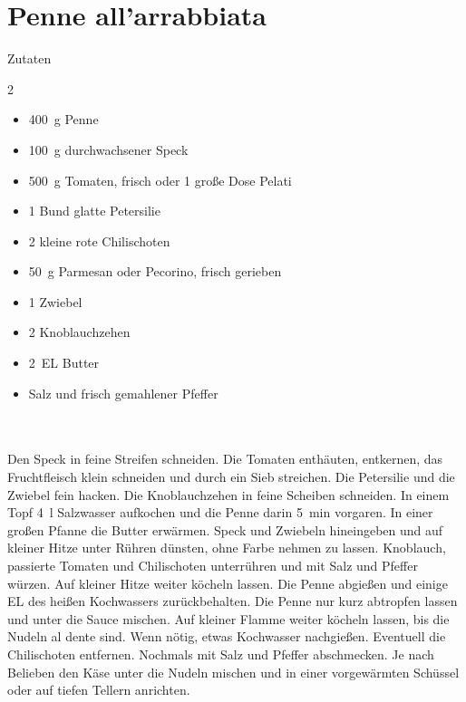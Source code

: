 \section*{Penne all'arrabbiata}
\ihead{}\ohead{}
\cfoot{}
{\Large Zutaten}
\begin{multicols}{2}
\begin{itemize}
\item \SI{400}{g} Penne
\item \SI{100}{g} durchwachsener Speck
\item \SI{500}{g} Tomaten, frisch oder \num{1} große Dose Pelati
\item \num{1} Bund glatte Petersilie
\item \num{2} kleine rote Chilischoten
\item \SI{50}{g} Parmesan oder Pecorino, frisch gerieben
\item \num{1} Zwiebel
\item \num{2} Knoblauchzehen
\item \SI{2}{EL} Butter
\item Salz und frisch gemahlener Pfeffer
\end{itemize}
\end{multicols}
\\
\\
Den Speck in feine Streifen schneiden.
Die Tomaten enthäuten, entkernen, das Fruchtfleisch klein schneiden und durch ein Sieb streichen.
Die Petersilie und die Zwiebel fein hacken.
Die Knoblauchzehen in feine Scheiben schneiden.
In einem Topf \SI{4}{l} Salzwasser aufkochen und die Penne darin \SI{5}{min} vorgaren.
In einer großen Pfanne die Butter erwärmen.
Speck und Zwiebeln hineingeben und auf kleiner Hitze unter Rühren dünsten, ohne Farbe nehmen zu lassen.
Knoblauch, passierte Tomaten und Chilischoten unterrühren und mit Salz und Pfeffer würzen.
Auf kleiner Hitze weiter köcheln lassen.
Die Penne abgießen und einige EL des heißen Kochwassers zurückbehalten.
Die Penne nur kurz abtropfen lassen und unter die Sauce mischen.
Auf kleiner Flamme weiter köcheln lassen, bis die Nudeln al dente sind.
Wenn nötig, etwas Kochwasser nachgießen.
Eventuell die Chilischoten entfernen.
Nochmals mit Salz und Pfeffer abschmecken.
Je nach Belieben den Käse unter die Nudeln mischen und in einer vorgewärmten Schüssel oder auf tiefen Tellern anrichten.

